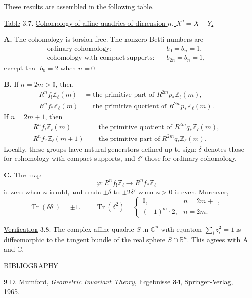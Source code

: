 
These results are assembled in the following table.

\underline{Table} 3.7. \underline{Cohomology of affine quadrics of
dimension $n$, $X^o=X-Y$.}

\medskip
\noindent\textbf{A.} The cohomology is torsion-free.  The nonzero Betti
numbers are
\begin{align*}
\text{ordinary cohomology:}\quad &b_0=b_n=1,\\
\text{cohomology with compact supports:}\quad &b_{2n}=b_n=1,
\end{align*}
except that $b_0=2$ when $n=0$.

\medskip
\noindent\textbf{B.} If $n=2m>0$, then
\begin{align*}
R^nf_!\mathbb Z_\ell(m)
  &=\text{the primitive part of }R^{2m}p_*\mathbb Z_\ell(m),\\
R^nf_*\mathbb Z_\ell(m)
  &=\text{the primitive quotient of }R^{2m}p_*\mathbb Z_\ell(m).
\end{align*}
If $n=2m+1$, then
\begin{align*}
R^nf_!\mathbb Z_\ell(m)
  &=\text{the primitive quotient of }R^{2m}q_*\mathbb Z_\ell(m),\\
R^nf_*\mathbb Z_\ell(m+1)
  &=\text{the primitive part of }R^{2m}q_*\mathbb Z_\ell(m).
\end{align*}
Locally, these groups have natural generators defined up to sign;
$\delta$ denotes those for cohomology with compact supports, and
$\delta'$ those for ordinary cohomology.

\medskip
\noindent\textbf{C.} The map
\begin{equation*}
\varphi:R^nf_!\mathbb Z_\ell\longrightarrow R^nf_*\mathbb Z_\ell
\end{equation*}
is zero when $n$ is odd, and sends $\pm\delta$ to $\pm2\delta'$ when
$n>0$ is even.  Moreover,
\begin{equation*}
\operatorname{Tr}(\delta\delta')=\pm1,
\qquad
\operatorname{Tr}(\delta^2)=
\begin{cases}
0, & n=2m+1,\\
(-1)^m\cdot2, & n=2m.
\end{cases}
\end{equation*}

\underline{Verification} 3.8. The complex affine quadric $S$ in
$\mathbb C^n$ with equation $\sum_i z_i^2=1$ is diffeomorphic to the
tangent bundle of the real sphere $S\cap\mathbb R^n$.  This agrees with
A and C.

\medskip
\underline{BIBLIOGRAPHY}

\begin{thebibliography}{9}
D. Mumford, \emph{Geometric Invariant Theory}, Ergebnisse \textbf{34},
Springer-Verlag, 1965.
\end{thebibliography}
